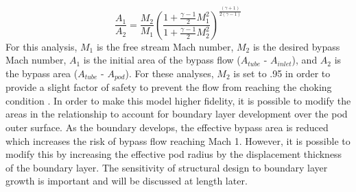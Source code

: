	\begin{equation}
		\label{eq:mach_to_area}
		\frac{A_{1}}{A_{2}}=\frac{M_{2}}{M_{1}} \left( \frac{1+\frac{\gamma -1}{2}M_{1}^{2}}{1+\frac{\gamma -1}{2}M_{2}^{2}} \right)^{\frac{( \gamma +1 )}{2 ( \gamma -1  )}}
	\end{equation}
	For this analysis, $M_1$ is the free stream Mach number, $M_2$ is the desired bypass Mach number, $A_1$ is the initial area of the bypass flow ($A_{tube}$ - $A_{inlet}$), and $A_2$ is the bypass area ($A_{tube}$ - $A_{pod}$). For these analyses, $M_2$ is set to .95 in order to provide a slight factor of safety to prevent the flow from reaching the choking condition .
	In order to make this model higher fidelity, it is possible to modify the areas in the relationship to account for boundary layer development over the pod outer surface. As the boundary develops, the effective bypass area is reduced which increases the risk of bypass flow reaching Mach 1. However, it is possible to modify this by increasing the effective pod radius by the displacement thickness of the boundary layer. The sensitivity of structural design to boundary layer growth is important and will be discussed at length later.
